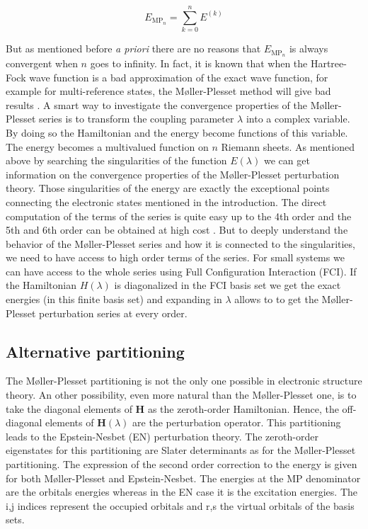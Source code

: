 \documentclass[11pt,a4paper]{article}
\newcommand{\bH}{\mathbf{H}}
\begin{document}
\begin{equation}
E_{\text{MP}_{n}}= \sum_{k=0}^n E^{(k)}
\end{equation}

But as mentioned before \textit{a priori} there are no reasons that $E_{\text{MP}_{n}}$ is always convergent when $n$ goes to infinity. In fact, it is known that when the Hartree-Fock wave function is a bad approximation of the exact wave function, for example for multi-reference states, the M{\o}ller-Plesset method will give bad results \cite{Gill_1986, Gill_1988, Handy_1985, Lepetit_1988}. A smart way to investigate the convergence properties of the M{\o}ller-Plesset series is to transform the coupling parameter $\lambda$ into a complex variable. By doing so the Hamiltonian and the energy become functions of this variable. The energy becomes a multivalued function on $n$ Riemann sheets. As mentioned above by searching the singularities of the function $E(\lambda)$ we can get information on the convergence properties of the M{\o}ller-Plesset perturbation theory. Those singularities of the energy are exactly the exceptional points connecting the electronic states mentioned in the introduction. The direct computation of the terms of the series is quite easy up to the 4th order and the 5th and 6th order can be obtained at high cost \cite{JensenBook}. But to deeply understand the behavior of the M{\o}ller-Plesset series and how it is connected to the singularities, we need to have access to high order terms of the series. For small systems we can have access to the whole series using Full Configuration Interaction (FCI). If the Hamiltonian $H(\lambda)$ is diagonalized in the FCI basis set we get the exact energies (in this finite basis set) and expanding in $\lambda$ allows to to get the M{\o}ller-Plesset perturbation series at every order.

\subsection{Alternative partitioning}\label{sec:AlterPart}

The M{\o}ller-Plesset partitioning is not the only one possible in electronic structure theory. An other possibility, even more natural than the M{\o}ller-Plesset one, is to take the diagonal elements of $\bH$ as the zeroth-order Hamiltonian. Hence, the off-diagonal elements of $\bH(\lambda)$ are the perturbation operator. This partitioning leads to the Epstein-Nesbet (EN) perturbation theory. The zeroth-order eigenstates for this partitioning are Slater determinants as for the M{\o}ller-Plesset partitioning. The expression of the second order correction to the energy is given for both M{\o}ller-Plesset and Epstein-Nesbet. The energies at the MP denominator are the orbitals energies whereas in the EN case it is the excitation energies. The i,j indices represent the occupied orbitals and r,s the virtual orbitals of the basis sets.
\end{document}
